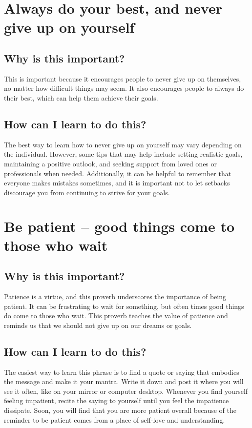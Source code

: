 \documentclass[11pt]{article}
\begin{document}
\section{Always do your best, and never give up on yourself}
\label{sec:org81c423e}
\subsection{Why is this important?}
\label{sec:org791ffaf}
This is important because it encourages people to never give up on themselves, no matter how difficult things may seem. It also encourages people to always do their best, which can help them achieve their goals.

\subsection{How can I learn to do this?}
\label{sec:orge15337b}
The best way to learn how to never give up on yourself may vary depending on the individual. However, some tips that may help include setting realistic goals, maintaining a positive outlook, and seeking support from loved ones or professionals when needed. Additionally, it can be helpful to remember that everyone makes mistakes sometimes, and it is important not to let setbacks discourage you from continuing to strive for your goals.

\section{Be patient – good things come to those who wait}
\label{sec:org4761db5}
\subsection{Why is this important?}
\label{sec:orgf6d6d51}
Patience is a virtue, and this proverb underscores the importance of being patient. It can be frustrating to wait for something, but often times good things do come to those who wait. This proverb teaches the value of patience and reminds us that we should not give up on our dreams or goals.

\subsection{How can I learn to do this?}
\label{sec:org4d560fb}
The easiest way to learn this phrase is to find a quote or saying that embodies the message and make it your mantra. Write it down and post it where you will see it often, like on your mirror or computer desktop. Whenever you find yourself feeling impatient, recite the saying to yourself until you feel the impatience dissipate. Soon, you will find that you are more patient overall because of the reminder to be patient comes from a place of self-love and understanding.
\end{document}
